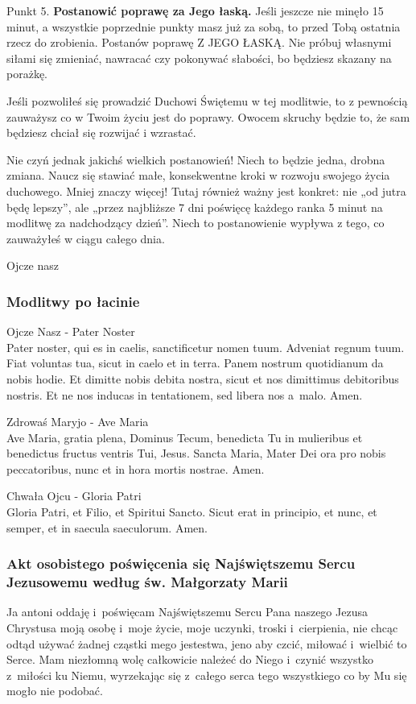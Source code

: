 \documentclass[twocolumn,fleqn,oneside,openany,a5paper,12pt]{book}
\begin{document}
Punkt 5.
\textbf{Postanowić poprawę za Jego łaską.}
Jeśli jeszcze nie minęło 15 minut, a wszystkie poprzednie punkty masz już za sobą, to przed Tobą ostatnia rzecz do zrobienia. Postanów poprawę Z JEGO ŁASKĄ. Nie próbuj własnymi siłami się zmieniać, nawracać czy pokonywać słabości, bo będziesz skazany na porażkę. 

Jeśli pozwoliłeś się prowadzić Duchowi Świętemu w tej modlitwie, to z pewnością zauważysz co w Twoim życiu jest do poprawy. Owocem skruchy będzie to, że sam będziesz chciał się rozwijać i wzrastać.

Nie czyń jednak jakichś wielkich postanowień! Niech to będzie jedna, drobna zmiana. Naucz się stawiać małe, konsekwentne kroki w rozwoju swojego życia duchowego. Mniej znaczy więcej! Tutaj również ważny jest konkret: nie „od jutra będę lepszy”, ale „przez najbliższe 7 dni poświęcę każdego ranka 5 minut na modlitwę za nadchodzący dzień”. Niech to postanowienie wypływa z tego, co zauważyłeś w ciągu całego dnia.

Ojcze nasz

\subsubsection*{Modlitwy po łacinie}
Ojcze Nasz - Pater Noster\\
 Pater noster, qui es in caelis, sanctificetur nomen tuum. Adveniat regnum tuum. Fiat voluntas tua, sicut in caelo et in terra. Panem nostrum quotidianum da nobis hodie. Et dimitte nobis debita nostra, sicut et nos dimittimus debitoribus nostris. Et ne nos inducas in tentationem, sed libera nos a~malo. Amen.


Zdrowaś Maryjo - Ave Maria\\
 Ave Maria, gratia plena, Dominus Tecum, benedicta Tu in mulieribus et benedictus fructus ventris Tui, Jesus. Sancta Maria, Mater Dei ora pro nobis peccatoribus, nunc et in hora mortis nostrae. Amen.


Chwała Ojcu - Gloria Patri\\
 Gloria Patri, et Filio, et Spiritui Sancto. Sicut erat in principio, et nunc, et semper, et in saecula saeculorum. Amen.

\subsubsection*{Akt osobistego poświęcenia się Najświętszemu Sercu Jezusowemu według św. Małgorzaty Marii}
Ja antoni oddaję i~poświęcam Najświętszemu Sercu Pana naszego Jezusa Chrystusa moją osobę i~moje życie, moje uczynki, troski i~cierpienia, nie chcąc odtąd używać żadnej cząstki mego jestestwa, jeno aby czcić, miłować i~wielbić to Serce. Mam niezłomną wolę całkowicie należeć do Niego i~czynić wszystko z~miłości ku Niemu, wyrzekając się z~całego serca tego wszystkiego co by Mu się mogło nie podobać.
\end{document}
